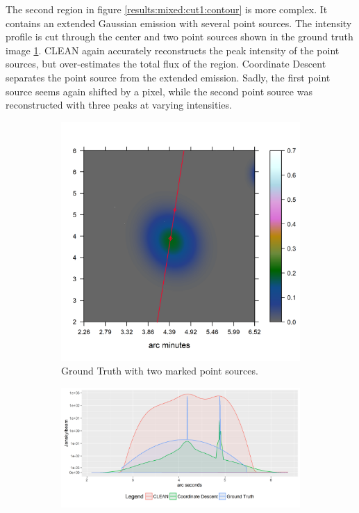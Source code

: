 The second region in figure \ref{results:mixed:cut1:contour} is more complex. It contains an extended Gaussian emission with several point sources. The intensity profile is cut through the center and two point sources shown in the ground truth image \ref{results:mixed:cut1:img}. CLEAN again accurately reconstructs the peak intensity of the point sources, but over-estimates the total flux of the region. Coordinate Descent separates the point source from the extended emission. Sadly, the first point source seems again shifted by a pixel, while the second point source was reconstructed with three peaks at varying intensities.

\begin{figure}[h]
	\centering
	\begin{subfigure}[b]{0.3\linewidth}
		\includegraphics[width=\linewidth, trim={0.4in, 0.9in, 3.2in, 1.8in}, clip]{./chapters/20.results/mixed/mixed_cut_model2_line.png}
		\caption{Ground Truth with two marked point sources.}
		\label{results:mixed:cut1:img}
	\end{subfigure}
	\begin{subfigure}[b]{0.6\linewidth}
		\includegraphics[width=\linewidth, trim={0, 0, 0.2in, 0.05in}, clip]{./chapters/20.results/mixed/mixed_cut2.png}

\end{subfigure}
\end{figure}
